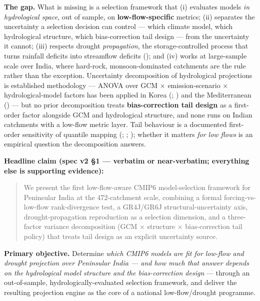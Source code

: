 \documentclass[
  english,
  11pt,
]{article}
\newcounter{none} %
\begin{document}
\textbf{The gap.} What is missing is a selection framework that (i)
evaluates models \emph{in hydrological space}, out of sample, on
\textbf{low-flow-specific} metrics; (ii) separates the uncertainty a
selection decision can control --- which climate model, which
hydrological structure, which bias-correction tail design --- from the
uncertainty it cannot; (iii) respects drought \emph{propagation}, the
storage-controlled process that turns rainfall deficits into streamflow
deficits (); and
(iv) works at large-sample scale over India, where hard-rock,
monsoon-dominated catchments are the rule rather than the exception.
Uncertainty decomposition of hydrological projections is established
methodology --- ANOVA over GCM × emission-scenario × hydrological-model
factors has been applied in Korea (; ) and the
Mediterranean () ---
but no prior decomposition treats \textbf{bias-correction tail design}
as a first-order factor alongside GCM and hydrological structure, and
none runs on Indian catchments with a low-flow metric layer. Tail
behaviour is a documented first-order sensitivity of quantile mapping
(;
;
); whether it
matters \emph{for low flows} is an empirical question the decomposition
answers.

\textbf{Headline claim (spec v2 §1 --- verbatim or near-verbatim;
everything else is supporting evidence):}

\begin{quote}
We present the first low-flow-aware CMIP6 model-selection framework for
Peninsular India at the 472-catchment scale, combining a formal
forcing-vs-low-flow rank-divergence test, a GR4J/GR6J
structural-uncertainty axis, drought-propagation reproduction as a
selection dimension, and a three-factor variance decomposition (GCM ×
structure × bias-correction tail policy) that treats tail design as an
explicit uncertainty source.
\end{quote}

\textbf{Primary objective.} Determine \emph{which CMIP6 models are fit
for low-flow and drought projection over Peninsular India --- and how
much that answer depends on the hydrological model structure and the
bias-correction design} --- through an out-of-sample,
hydrologically-evaluated selection framework, and deliver the resulting
projection engine as the core of a national low-flow/drought programme.
\end{document}

